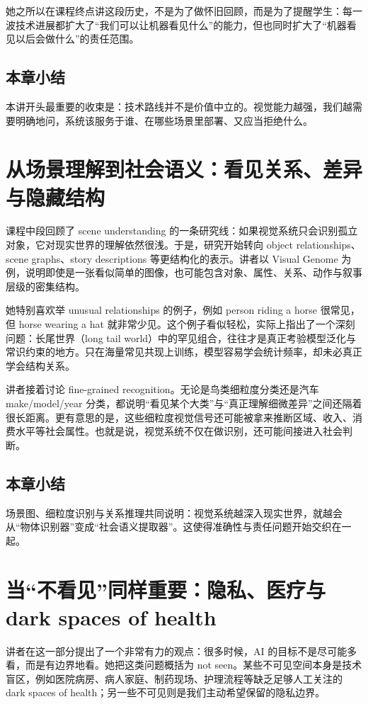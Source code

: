 \documentclass[a4paper]{article}
\begin{document}
她之所以在课程终点讲这段历史，不是为了做怀旧回顾，而是为了提醒学生：每一波技术进展都扩大了“我们可以让机器看见什么”的能力，但也同时扩大了“机器看见以后会做什么”的责任范围。

\subsection{本章小结}

本讲开头最重要的收束是：技术路线并不是价值中立的。视觉能力越强，我们越需要明确地问，系统该服务于谁、在哪些场景里部署、又应当拒绝什么。

\section{从场景理解到社会语义：看见关系、差异与隐藏结构}

课程中段回顾了 scene understanding 的一条研究线：如果视觉系统只会识别孤立对象，它对现实世界的理解依然很浅。于是，研究开始转向 object relationships、scene graphs、story descriptions 等更结构化的表示。讲者以 Visual Genome 为例，说明即使是一张看似简单的图像，也可能包含对象、属性、关系、动作与叙事层级的密集结构。

她特别喜欢举 unusual relationships 的例子，例如 person riding a horse 很常见，但 horse wearing a hat 就非常少见。这个例子看似轻松，实际上指出了一个深刻问题：长尾世界（long tail world）中的罕见组合，往往才是真正考验模型泛化与常识约束的地方。只在海量常见共现上训练，模型容易学会统计频率，却未必真正学会结构关系。

讲者接着讨论 fine-grained recognition。无论是鸟类细粒度分类还是汽车 make/model/year 分类，都说明“看见某个大类”与“真正理解细微差异”之间还隔着很长距离。更有意思的是，这些细粒度视觉信号还可能被拿来推断区域、收入、消费水平等社会属性。也就是说，视觉系统不仅在做识别，还可能间接进入社会判断。

\subsection{本章小结}

场景图、细粒度识别与关系推理共同说明：视觉系统越深入现实世界，就越会从“物体识别器”变成“社会语义提取器”。这使得准确性与责任问题开始交织在一起。

\section{当“不看见”同样重要：隐私、医疗与 dark spaces of health}

讲者在这一部分提出了一个非常有力的观点：很多时候，AI 的目标不是尽可能多看，而是有边界地看。她把这类问题概括为 not seen。某些不可见空间本身是技术盲区，例如医院病房、病人家庭、制药现场、护理流程等缺乏足够人工关注的 dark spaces of health；另一些不可见则是我们主动希望保留的隐私边界。
\end{document}
